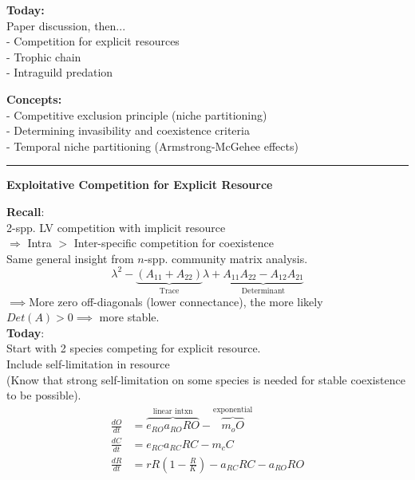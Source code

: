 \documentclass{article}
\newcommand{\ind}{\-\hspace{1cm}}
\begin{document}
\noindent{}

\textbf{Today:}\\
\ind Paper discussion, then...\\
\ind \ind - Competition for explicit resources\\
\ind \ind - Trophic chain\\
\ind \ind - Intraguild predation

\textbf{Concepts:}\\
\ind - Competitive exclusion principle (niche partitioning)\\
\ind - Determining invasibility and coexistence criteria\\
\ind - Temporal niche partitioning (Armstrong-McGehee effects)

\rule[0.5ex]{\linewidth}{1pt}
\begin{center}
	\textbf{Exploitative Competition for Explicit Resource}
\end{center}

\textbf{Recall}:\\
2-spp. LV competition with implicit resource\\
\ind \ind $\Rightarrow$ Intra $>$ Inter-specific competition for coexistence\\
\ind Same general insight from $n$-spp. community matrix analysis.
\begin{equation*}
	\lambda^2 - \underbrace{(A_{11}+A_{22})}_{\text{Trace}}\lambda + \underbrace{A_{11}A_{22} - A_{12}A_{21}}_{\text{Determinant}}
\end{equation*}
\ind $\implies$More zero off-diagonals (lower connectance), the more likely $Det(A)>0 \implies $ more stable.\\

\textbf{Today}:\\
Start with 2 species competing for explicit resource.\\
\ind Include self-limitation in resource\\
\ind  (Know that strong self-limitation on some species is needed for stable coexistence to be possible).
\begin{align*}
	\frac{dO}{dt}&=\overbrace{e_{RO}a_{RO}R O}^{\text{linear intxn}} - \overbrace{m_o O}^{\text{exponential}}\\
	\frac{dC}{dt}&=e_{RC}a_{RC}RC - m_c C\\
	\frac{dR}{dt}&=r R \left(1-\frac{R}{K}\right) - a_{RC}RC - a_{RO}RO
\end{align*}
\end{document}
